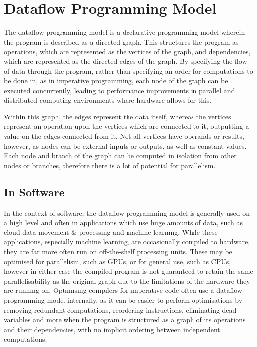 \section{Dataflow Programming Model}\label{dataflow}
The dataflow programming model is a declarative programming model wherein the program is described as a directed graph. This structures the program as operations, which are represented as the vertices of the graph, and dependencies, which are represented as the directed edges of the graph. By specifying the flow of data through the program, rather than specifying an order for computations to be done in, as in imperative programming, each node of the graph can be executed concurrently, leading to performance improvements in parallel and distributed computing environments where hardware allows for this.

Within this graph, the edges represent the data itself, whereas the vertices represent an operation upon the vertices which are connected to it, outputting a value on the edges connected from it. Not all vertices have operands or results, however, as nodes can be external inputs or outputs, as well as constant values. Each node and branch of the graph can be computed in isolation from other nodes or branches, therefore there is a lot of potential for parallelism.

\subsection{In Software}
In the context of software, the dataflow programming model is generally used on a high level and often in applications which use huge amounts of data, such as cloud data movement \& processing and machine learning. While these applications, especially machine learning, are occasionally compiled to hardware, they are far more often run on off-the-shelf processing units. These may be optimised for parallelism, such as GPUs, or for general use, such as CPUs, however in either case the compiled program is not guaranteed to retain the same parallelisability as the original graph due to the limitations of the hardware they are running on. Optimising compilers for imperative code often use a dataflow programming model internally, as it can be easier to perform optimisations by removing redundant computations, reordering instructions, eliminating dead variables and more when the program is structured as a graph of its operations and their dependencies, with no implicit ordering between independent computations.

